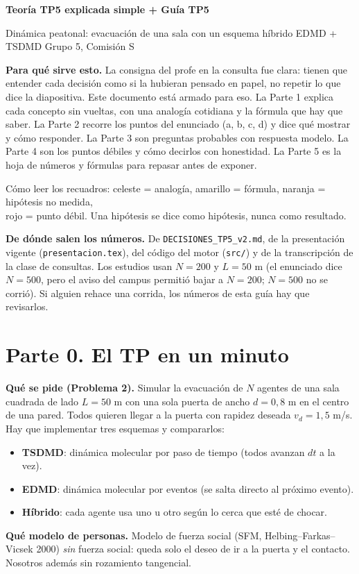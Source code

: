 \documentclass[10.5pt,a4paper]{article}
\begin{document}
{\LARGE\bfseries Teoría TP5 explicada simple + Guía TP5}\par
{\large Dinámica peatonal: evacuación de una sala con un esquema híbrido EDMD + TSDMD \textbar{} Grupo 5, Comisión S}\par
\vspace{4pt}

\textbf{Para qué sirve esto.} La consigna del profe en la consulta fue clara: tienen que entender cada decisión como si la hubieran pensado en papel, no repetir lo que dice la diapositiva. Este documento está armado para eso. La Parte 1 explica cada concepto sin vueltas, con una analogía cotidiana y la fórmula que hay que saber. La Parte 2 recorre los puntos del enunciado (a, b, c, d) y dice qué mostrar y cómo responder. La Parte 3 son preguntas probables con respuesta modelo. La Parte 4 son los puntos débiles y cómo decirlos con honestidad. La Parte 5 es la hoja de números y fórmulas para repasar antes de exponer.

Cómo leer los recuadros: \colorbox{ana}{celeste = analogía}, \colorbox{fml}{amarillo = fórmula}, \colorbox{hipo}{naranja = hipótesis no medida},\\ \colorbox{deb}{rojo = punto débil}. Una hipótesis se dice como hipótesis, nunca como resultado.

\textbf{De dónde salen los números.} De \texttt{DECISIONES\_TP5\_v2.md}, de la presentación vigente (\texttt{presentacion.tex}), del código del motor (\texttt{src/}) y de la transcripción de la clase de consultas. Los estudios usan $N=200$ y $L=50$ m (el enunciado dice $N=500$, pero el aviso del campus permitió bajar a $N=200$; $N=500$ no se corrió). Si alguien rehace una corrida, los números de esta guía hay que revisarlos.

\section*{Parte 0. El TP en un minuto}

\textbf{Qué se pide (Problema 2).} Simular la evacuación de $N$ agentes de una sala cuadrada de lado $L=50$ m con una sola puerta de ancho $d=0{,}8$ m en el centro de una pared. Todos quieren llegar a la puerta con rapidez deseada $v_d=1{,}5$ m/s. Hay que implementar tres esquemas y compararlos:
\begin{itemize}
\item \textbf{TSDMD}: dinámica molecular por paso de tiempo (todos avanzan $dt$ a la vez).
\item \textbf{EDMD}: dinámica molecular por eventos (se salta directo al próximo evento).
\item \textbf{Híbrido}: cada agente usa uno u otro según lo cerca que esté de chocar.
\end{itemize}
\textbf{Qué modelo de personas.} Modelo de fuerza social (SFM, Helbing--Farkas--Vicsek 2000) \emph{sin} fuerza social: queda solo el deseo de ir a la puerta y el contacto. Nosotros además sin rozamiento tangencial.
\end{document}

